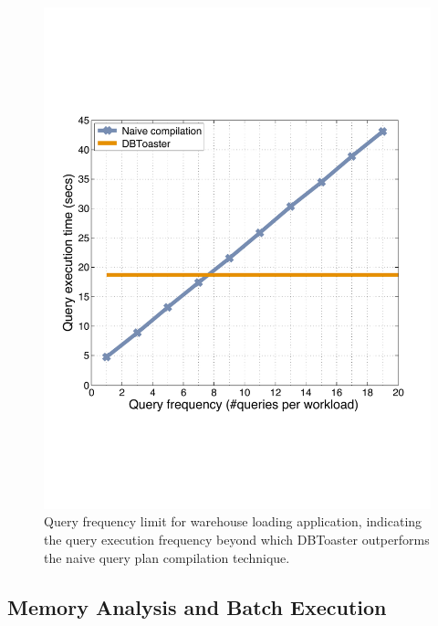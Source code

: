 \begin{figure}
\begin{center}
\includegraphics[scale=0.25]{../plots/ssb_query_freq_dn}
\end{center}
\caption{Query frequency limit for warehouse loading application, indicating the
query execution frequency beyond which DBToaster outperforms the naive query
plan compilation technique.}
\label{fig:ssb_query_freq}
\end{figure}

\subsection{Memory Analysis and Batch Execution}


